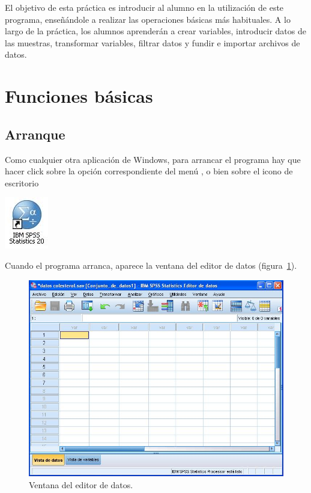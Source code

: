 El objetivo de esta práctica es introducir al alumno en la utilización de este programa, enseñándole a realizar las operaciones básicas más habituales. A lo largo de la práctica, los alumnos aprenderán a crear variables, introducir datos de las muestras, transformar variables, filtrar datos y fundir e importar archivos de datos.  


\section{Funciones básicas}
\subsection{Arranque}
Como cualquier otra aplicación de Windows, para arrancar el programa
hay que hacer click sobre la opción correspondiente del menú
, o bien sobre el icono de escritorio
\begin{center}
  \includegraphics{introduccion_spss/img/icono}
\end{center}

Cuando el programa arranca, aparece la ventana del editor de datos (figura~\ref{g:vista_datos}).
\begin{figure}[h!]
\begin{center}
\includegraphics[scale=0.5]{introduccion_spss/img/vista_datos}
\caption{Ventana del editor de datos.}
\label{g:vista_datos}
\end{center}
\end{figure}
 
